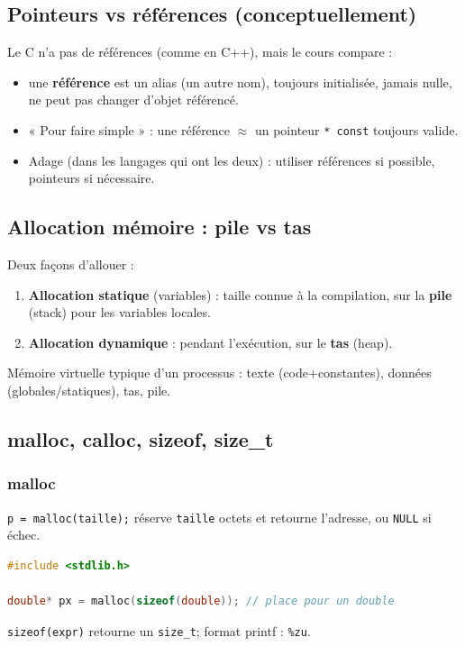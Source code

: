 \subsection{Pointeurs vs références (conceptuellement)}
Le C n’a pas de références (comme en C++), mais le cours compare : 
\begin{itemize}
  \item une \textbf{référence} est un alias (un autre nom), toujours initialisée, jamais nulle,
        ne peut pas changer d’objet référencé.
  \item « Pour faire simple » : une référence $\approx$ un pointeur \texttt{* const} toujours valide.
  \item Adage (dans les langages qui ont les deux) : utiliser références si possible, pointeurs si nécessaire.
\end{itemize}

\subsection{Allocation mémoire : pile vs tas}
Deux façons d’allouer : 
\begin{enumerate}
  \item \textbf{Allocation statique} (variables) : taille connue à la compilation, sur la \textbf{pile} (stack) pour les variables locales.
  \item \textbf{Allocation dynamique} : pendant l’exécution, sur le \textbf{tas} (heap).
\end{enumerate}

Mémoire virtuelle typique d’un processus : texte (code+constantes), données (globales/statiques), tas, pile.

\subsection{malloc, calloc, sizeof, size\_t}
\subsubsection{malloc}
\texttt{p = malloc(taille);} réserve \texttt{taille} octets et retourne l’adresse, ou \texttt{NULL} si échec. 

\begin{lstlisting}[language=C]
#include <stdlib.h>

double* px = malloc(sizeof(double)); // place pour un double
\end{lstlisting}

\texttt{sizeof(expr)} retourne un \texttt{size\_t}; format printf : \texttt{\%zu}.

